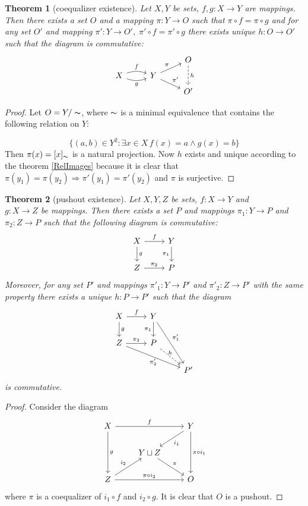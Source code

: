 \documentclass[a4paper, 12pt]{article}
\newtheorem{thm}{Theorem}
\begin{document}
\begin{thm}[coequalizer existence]
    Let $X, Y$ be sets, $f, g:X\to Y$ are mappings. Then there exists
    a set $O$ and a mapping $\pi: Y\to O$ such that $\pi\circ f=\pi\circ g$
    and for any set $O'$ and mapping $\pi':Y\to O',\; \pi'\circ f = \pi'\circ g$
    there exists unique $h:O\to O'$ such that 
    the diagram is commutative: 
    \[
    \begin{tikzcd}[row sep=tiny]
        &                     &   O\arrow[dd, dashrightarrow, "h"]\\ 
        X\arrow[r, bend left=20, "f"]\arrow[r, bend right=20, "g"{below}]& Y\arrow[ur, "\pi"]\arrow[dr, "\pi'"] & \\
        &                     &   O'
    \end{tikzcd}
    \]
\end{thm}
\begin{proof}
    Let $O=Y/\thicksim$, where $\thicksim$ is a minimal equivalence that contains the following 
    relation on $Y$:

    \[
        \{(a, b)\in Y^2: \exists x\in X\,f(x)=a \land  g(x)=b\}
    \]
    Then $\pi(x)=[x]_\thicksim$ is a natural projection.
    Now $h$ exists and unique according to the theorem \ref{RelImages}
    because it is clear that $\pi(y_1)=\pi(y_2) \Rightarrow
    \pi'(y_1)=\pi'(y_2)$ and $\pi$ is surjective.
\end{proof}
\begin{thm}[pushout existence]
Let $X, Y, Z$ be sets, $f:X\to Y$ and\\ $g:X\to Z$ be mappings. Then there exists a set $P$
and mappings $\pi_1: Y\to P$ and $\pi_2: Z\to P$ such that the following diagram is commutative:
\[
    \begin{tikzcd}
       X\arrow[r, "f"]\arrow[d, "g"] & Y\arrow[d, "\pi_1"{left}]\\
       Z\arrow[r, "\pi_2"] & P
    \end{tikzcd}
\]
Moreover, for any set $P'$ and 
mappings $\pi'_1:Y\to P'$ and $\pi'_2:Z\to P'$ with the same property there exists a unique $h:P\to P'$ 
such that the diagram
\[
    \begin{tikzcd}
       X\arrow[r, "f"]\arrow[d, "g"] & Y\arrow[d, "\pi_1"{left}]\arrow[ddr, "\pi'_1"] & \\
       Z\arrow[r, "\pi_2"]\arrow[drr, "\pi'_2"{below}] & P\arrow[dr, dashrightarrow, "h"{above}] & \\
       & & P'
    \end{tikzcd}
\]
is commutative.
\end{thm}
\begin{proof}
   Consider the diagram
   \[
        \begin{tikzcd}
            X\arrow[rr, "f"]\arrow[dd, "g"] & & Y\arrow[ld, "i_1"]\arrow[dd, "\pi\circ i_1"] \\
            & Y\sqcup Z\arrow[rd, "\pi"] & \\
            Z\arrow[ru, "i_2"]\arrow[rr, "\pi\circ i_2"] & & O
        \end{tikzcd}
   \]
   where $\pi$ is a coequalizer of $i_1\circ f$ and $i_2\circ g$. It is clear
   that $O$ is a pushout.
\end{proof}
\end{document}
